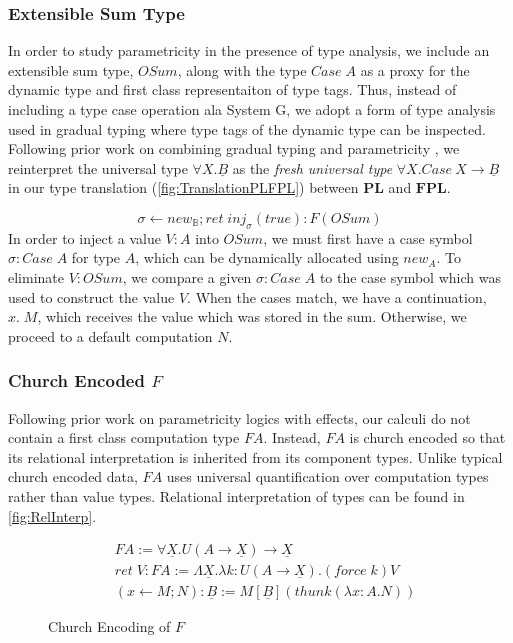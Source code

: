 \documentclass[acmsmall]{acmart}
\newcommand{\pl}{$\mathbf{PL}$}
\newcommand{\fpl}{$\mathbf{FPL}$}
\begin{document}
\subsubsection{Extensible Sum Type}\label{sec:OSum}
In order to study parametricity in the presence of type analysis, we include an extensible sum type, $OSum$, along with the type $Case\;A$ as a proxy for the dynamic type and first class representaiton of type tags. Thus, instead of including a type case operation ala System G\cite{NonParam}, we adopt a form of type analysis used in gradual typing where type tags of the dynamic type can be inspected. Following prior work on combining gradual typing and parametricity \cite{GradParam}, we reinterpret the universal type $\forall X. \underline{B}$ as the \emph{fresh universal type} $\forall X. Case\:X \rightarrow \underline{B}$ in our type translation (\cref{fig:TranslationPLFPL}) between \pl\; and \fpl.


$$
\sigma \leftarrow new_{\mathbb{B}}; ret\; inj_\sigma (true) : F(OSum)
$$
In order to inject a value $V : A$ into $OSum$, we must first have a case symbol $\sigma : Case\;A$ for type $A$, which can be dynamically allocated using $new_A$. 
To eliminate $V : OSum$, we compare a given $\sigma : Case\;A$ to the case symbol which was used to construct the value $V$. When the cases match, we have a continuation, $x.\;M$, which receives the value which was stored in the sum. Otherwise, we proceed to a default computation $N$. 


\subsubsection{Church Encoded $F$}\label{sec:ChurchEncF}
Following prior work on parametricity logics with effects\cite{PE}, our calculi do not contain a first class computation type $FA$. Instead, $FA$ is church encoded so that its relational interpretation is inherited from its component types. Unlike typical church encoded data, $FA$ uses universal quantification over computation types rather than value types. Relational interpretation of types can be found in \cref{fig:RelInterp}.
\begin{figure}[H]
  \centering
  \begin{align*}
    &FA := \forall \underline{X}.U(A \to \underline{X}) \to \underline{X}\\
    &ret\;V : F A := \Lambda \underline{X}.\lambda k:U(A \to \underline{X}). (force\; k)V\\
    &(x \leftarrow M; N) : \underline{B}:= M[\underline{B}](thunk(\lambda x : A.N))
  \end{align*}
  \caption{Church Encoding of $F$}
\end{figure}
\end{document}
